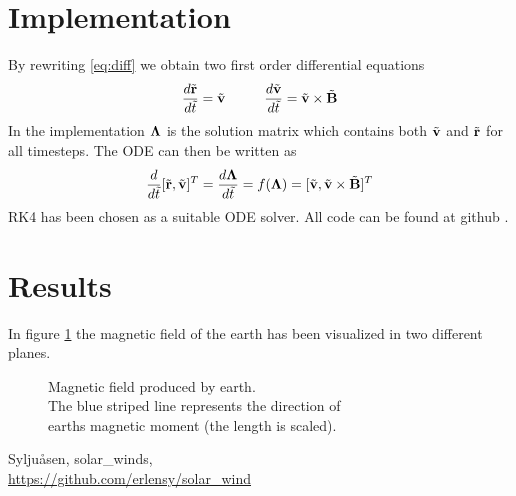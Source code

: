 \documentclass[11pt]{article}
\begin{document}
\section{Implementation}
By rewriting \eqref{eq:diff} we obtain two first order differential equations
\begin{equation}
    \frac{d\tilde{\vectorbold{r}}}{d\tilde{t}} = \tilde{\vectorbold{v}}\\
    \hspace{10mm} \frac{d\tilde{\vectorbold{v}}}{d\tilde{t}} = \tilde{\vectorbold{v}} \times \tilde{\vectorbold{B}} 
\end{equation}
In the implementation $\vectorbold{\Lambda}$ is the solution matrix which contains both $\tilde{\vectorbold{v}}$ and $\tilde{\vectorbold{r}}$ for all timesteps. The ODE can then be written as $$\frac{d}{d\tilde{t}} [\tilde{\vectorbold{r}}, \tilde{\vectorbold{v}}]^T = \frac{d\vectorbold{\Lambda}}{d\tilde{t}} = f(\vectorbold{\Lambda}) = [\tilde{\vectorbold{v}}, \tilde{\vectorbold{v}} \times \tilde{\vectorbold{B}}]^{T}$$
RK4 has been chosen as a suitable ODE solver. All code can be found at github \cite{erlensy_github}.

\section{Results}
In figure \ref{fig:mag_field} the magnetic field of the earth has been visualized in two different planes.
\begin{figure}[htp]
    \centering
    \captionsetup{justification=centering}
    \hspace{1em}
    \caption{Magnetic field produced by earth.\\The blue striped line represents the direction of \\earths magnetic moment (the length is scaled).}
    \label{fig:mag_field}
\end{figure}

\begin{thebibliography}{99}
     Syljuåsen, solar\_winds, \\\url{https://github.com/erlensy/solar_wind}
\end{thebibliography}
\end{document}
